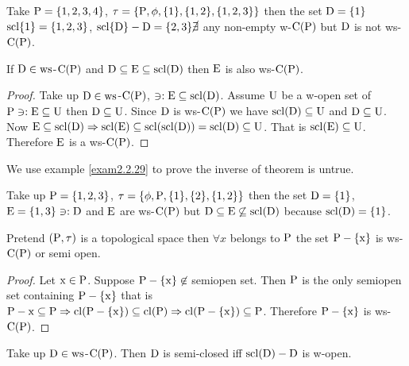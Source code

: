 \begin{exm}\label{exam2.2.27}
Take $\mathrm{P}=\{1,2,3,4\}$, $\tau=\{\mathrm{P},\phi,\{1\},\{1, 2\},\{1,2,3\}\}$ then the set $\mathrm{D}=\{1\}$ $\mathrm{scl}\{1\}=\{1,2,3\}$, $\mathrm{scl}\{\mathrm{D}\}-\mathrm{D}=\{2,3\}\cancel{\exists}$ any non-empty w-$\mathrm{C}(\mathrm{P})$ but $\mathrm{D}$ is not ws-$\mathrm{C}(\mathrm{P})$.
\end{exm}

\begin{thm}\label{thm2.2.28}
If $\mathrm{D}\in\mathrm{ws}$-$\mathrm{C}(\mathrm{P})$ and $\mathrm{D}\subseteq \mathrm{E}\subseteq \mathrm{scl}(\mathrm{D})$ then $\mathrm{E}$ is also ws-$\mathrm{C}(\mathrm{P})$.
\end{thm}

\begin{proof}
Take up $\mathrm{D}\in \mathrm{ws}$-$\mathrm{C}(\mathrm{P})$, $\ni: \mathrm{E}\subseteq \mathrm{scl}(\mathrm{D})$. Assume $\mathrm{U}$ be a w-open set of $\mathrm{P} \ni: \mathrm{E}\subseteq \mathrm{U}$ then $\mathrm{D}\subseteq \mathrm{U}$. Since $\mathrm{D}$ is ws-$\mathrm{C}(\mathrm{P})$ we have $\mathrm{scl}(\mathrm{D})\subseteq \mathrm{U}$ and $\mathrm{D}\subseteq \mathrm{U}$. Now $\mathrm{E}\subseteq \mathrm{scl}(\mathrm{D})\Rightarrow\mathrm{scl}(\mathrm{E})\subseteq \mathrm{scl}(\mathrm{scl}(\mathrm{D}))=\mathrm{scl}(\mathrm{D})\subseteq \mathrm{U}$. That is $\mathrm{scl}(\mathrm{E})\subseteq \mathrm{U}$. Therefore $\mathrm{E}$ is a ws-$\mathrm{C}(\mathrm{P})$.
\end{proof}

We use example \ref{exam2.2.29} to prove the inverse of theorem is untrue.

\begin{exm}\label{exam2.2.29}
Take up $\mathrm{P} = \{1,2,3 \}$, $\tau = \{\phi, \mathrm{P}, \{1\}, \{2\}, \{1, 2\}\}$ then the set $\mathrm{D}=\{1\}$, $\mathrm{E}=\{1,3\}\ni:\mathrm{D}$ and $\mathrm{E}$ are ws-$\mathrm{C}(\mathrm{P})$ but $\mathrm{D}\subseteq \mathrm{E} \not\subseteq\mathrm{scl}(\mathrm{D})$ because $\mathrm{scl}(\mathrm{D})=\{1\}$.
\end{exm}

\begin{thm}\label{thm2.2.30}
Pretend $(\mathrm{P},\tau)$ is a topological space then $\forall x$ belongs to $\mathrm{P}$ the set $\mathrm{P}-\{\mathrm{x}\}$ is ws-$\mathrm{C}(\mathrm{P})$ or semi open.
\end{thm}

\begin{proof}
Let $\mathrm{x}\in\mathrm{P}$. Suppose $\mathrm{P}-\{\mathrm{x}\}\not\in$ semiopen set. Then $\mathrm{P}$ is the only semiopen set containing $\mathrm{P}-\{\mathrm{x}\}$ that is $\mathrm{P}-{\mathrm{x}} \subseteq \mathrm{P}\Rightarrow \mathrm{cl}(\mathrm{P}-\{\mathrm{x}\}) \subseteq \mathrm{cl}(\mathrm{P})\Rightarrow \mathrm{cl}(\mathrm{P}-\{\mathrm{x}\})\subseteq \mathrm{P}$. Therefore $\mathrm{P}-\{\mathrm{x}\}$ is ws-$\mathrm{C}(\mathrm{P})$.
\end{proof}

\begin{thm}\label{thm2.2.31}
Take up $\mathrm{D}\in \mathrm{ws}$-$\mathrm{C}(\mathrm{P})$. Then $\mathrm{D}$ is semi-closed iff $\mathrm{scl}(\mathrm{D})-\mathrm{D}$ is w-open.
\end{thm}

